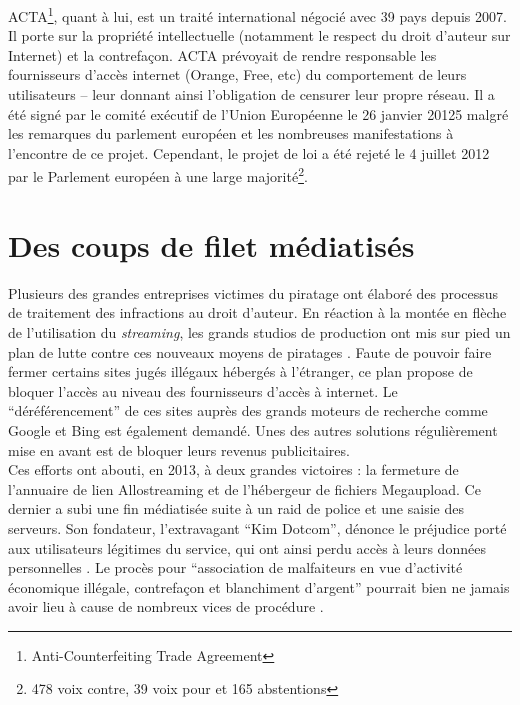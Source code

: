\documentclass[a4paper]{report}
\begin{document}
		ACTA\footnote{Anti-Counterfeiting Trade Agreement}, quant à lui, est un traité international négocié avec 39 pays \cite{no-to-acta} depuis 2007. Il porte sur la propriété intellectuelle (notamment le respect du droit d'auteur sur Internet) et la contrefaçon. ACTA prévoyait de rendre responsable les fournisseurs d'accès internet (Orange, Free, etc) du comportement de leurs utilisateurs – leur donnant ainsi l'obligation de censurer leur propre réseau. Il a été signé par le comité exécutif de l'Union Européenne le 26 janvier 20125 malgré les remarques du parlement européen et les nombreuses manifestations à l'encontre de ce projet. Cependant, le projet de loi a été rejeté le 4 juillet 2012 par le Parlement européen \cite{acta-vote} à une large majorité\footnote{478 voix contre, 39 voix pour et 165 abstentions}.


	\section{Des coups de filet médiatisés}
	Plusieurs des grandes entreprises victimes du piratage ont élaboré des processus de traitement des infractions au droit d'auteur. En réaction à la montée en flèche de l'utilisation du \emph{streaming}, les grands studios de production ont mis sur pied un plan de lutte contre ces nouveaux moyens de piratages \cite{lutte-streaming}. Faute de pouvoir faire fermer certains sites jugés illégaux hébergés à l'étranger, ce plan propose de bloquer l'accès au niveau des fournisseurs d'accès à internet. Le ``déréférencement'' de ces sites auprès des grands moteurs de recherche comme Google et Bing est également demandé. Unes des autres solutions régulièrement mise en avant est de bloquer leurs revenus publicitaires.\\

	Ces efforts ont abouti, en 2013, à deux grandes victoires : la fermeture de l'annuaire de lien Allostreaming \cite{allostreaming-fermeture} et de l'hébergeur de fichiers Megaupload. Ce dernier a subi une fin médiatisée \cite{megaupload-fermeture} suite à un raid de police et une saisie des serveurs. Son fondateur, l'extravagant ``Kim Dotcom'', dénonce le préjudice porté aux utilisateurs légitimes du service, qui ont ainsi perdu accès à leurs données personnelles \cite{megaupload-prejudice}. Le procès pour ``association de malfaiteurs en vue d'activité économique illégale, contrefaçon et blanchiment d'argent'' pourrait bien ne jamais avoir lieu à cause de nombreux vices de procédure \cite{megaupload-proces}.\\
\end{document}
